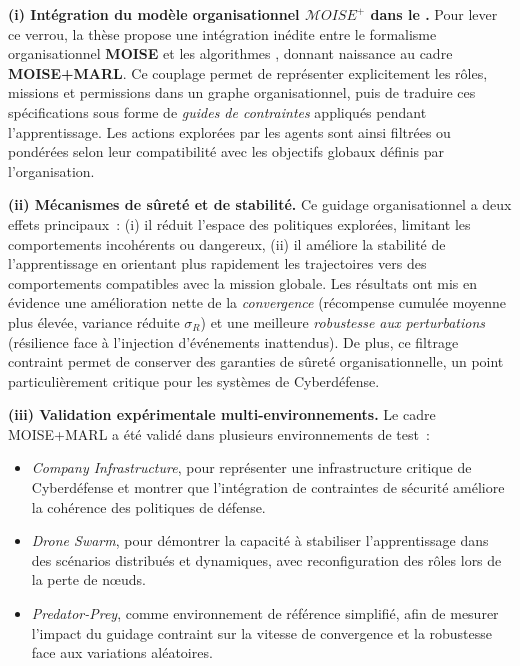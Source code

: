\medskip
\noindent
\textbf{(i) Intégration du modèle organisationnel $\mathcal{M}OISE^+$ dans le .}
Pour lever ce verrou, la thèse propose une intégration inédite entre le formalisme organisationnel \textbf{MOISE} et les algorithmes , donnant naissance au cadre \textbf{MOISE+MARL}.
Ce couplage permet de représenter explicitement les rôles, missions et permissions dans un graphe organisationnel, puis de traduire ces spécifications sous forme de \textit{guides de contraintes} appliqués pendant l'apprentissage.
Les actions explorées par les agents sont ainsi filtrées ou pondérées selon leur compatibilité avec les objectifs globaux définis par l'organisation.

\medskip
\noindent
\textbf{(ii) Mécanismes de sûreté et de stabilité.}
Ce guidage organisationnel a deux effets principaux~:
(i) il réduit l'espace des politiques explorées, limitant les comportements incohérents ou dangereux,
(ii) il améliore la stabilité de l'apprentissage en orientant plus rapidement les trajectoires vers des comportements compatibles avec la mission globale.
Les résultats ont mis en évidence une amélioration nette de la \textit{convergence} (récompense cumulée moyenne plus élevée, variance réduite $\sigma_R$) et une meilleure \textit{robustesse aux perturbations} (résilience face à l'injection d'événements inattendus).
De plus, ce filtrage contraint permet de conserver des garanties de sûreté organisationnelle, un point particulièrement critique pour les systèmes de Cyberdéfense.

\medskip
\noindent
\textbf{(iii) Validation expérimentale multi-environnements.}
Le cadre MOISE+MARL a été validé dans plusieurs environnements de test~:
\begin{itemize}
  \item \textit{Company Infrastructure}, pour représenter une infrastructure critique de Cyberdéfense et montrer que l'intégration de contraintes de sécurité améliore la cohérence des politiques de défense.
  \item \textit{Drone Swarm}, pour démontrer la capacité à stabiliser l'apprentissage dans des scénarios distribués et dynamiques, avec reconfiguration des rôles lors de la perte de nœuds.
  \item \textit{Predator-Prey}, comme environnement de référence simplifié, afin de mesurer l'impact du guidage contraint sur la vitesse de convergence et la robustesse face aux variations aléatoires.
\end{itemize}

